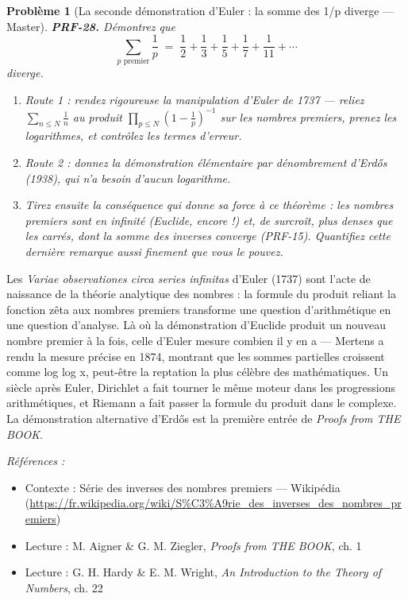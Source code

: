 \documentclass[11pt]{article}
\newtheorem{problem}{Problème}
\newenvironment{refs}{\par\small\noindent\emph{Références :}\begin{itemize}\setlength\itemsep{0pt}}{\end{itemize}\normalsize}
\begin{document}
\begin{problem}[{La seconde démonstration d'Euler : la somme des 1/p diverge --- Master}]
\textbf{PRF-28.} Démontrez que
\[ \sum_{p \text{ premier}} \frac{1}{p} \;=\; \frac{1}{2} + \frac{1}{3} + \frac{1}{5} + \frac{1}{7} + \frac{1}{11} + \cdots \]
diverge.
\begin{enumerate}
\item[(a)] Route 1 : rendez rigoureuse la manipulation d'Euler de 1737 --- reliez
$ \sum_{n \le N} \frac{1}{n} $ au produit
$ \prod_{p \le N} \left(1 - \frac{1}{p}\right)^{-1} $
sur les nombres premiers, prenez les logarithmes, et contrôlez les termes d'erreur.
\item[(b)] Route 2 : donnez la démonstration élémentaire par dénombrement d'Erd\H{o}s (1938), qui n'a
besoin d'aucun logarithme.
\item[(c)] Tirez ensuite la conséquence qui donne sa force à ce théorème : les nombres premiers
sont en infinité (Euclide, encore !) et, de surcroît, plus \og{} denses \fg{} que les carrés, dont
la somme des inverses converge (PRF-15). Quantifiez cette dernière remarque aussi finement
que vous le pouvez.
\end{enumerate}

\end{problem}

\noindent Les \textit{Variae observationes circa series infinitas} d'Euler (1737) sont
l'acte de naissance de la théorie analytique des nombres : la formule du produit reliant la
fonction zêta aux nombres premiers transforme une question d'arithmétique en une question
d'analyse. Là où la démonstration d'Euclide produit un nouveau nombre premier à la fois,
celle d'Euler mesure combien il y en a --- Mertens a rendu la mesure précise en 1874, montrant
que les sommes partielles croissent comme log log x, peut-être la reptation la plus célèbre
des mathématiques. Un siècle après Euler, Dirichlet a fait tourner le même moteur dans les
progressions arithmétiques, et Riemann a fait passer la formule du produit dans le complexe.
La démonstration alternative d'Erd\H{o}s est la première entrée de \textit{Proofs from THE
BOOK}.

\begin{refs}
\item Contexte : Série des inverses des nombres premiers --- Wikipédia (\url{https://fr.wikipedia.org/wiki/S%C3%A9rie_des_inverses_des_nombres_premiers})
\item Lecture : M. Aigner \& G. M. Ziegler, \textit{Proofs from THE BOOK}, ch. 1
\item Lecture : G. H. Hardy \& E. M. Wright, \textit{An Introduction to the Theory of Numbers}, ch. 22
\end{refs}
\end{document}
